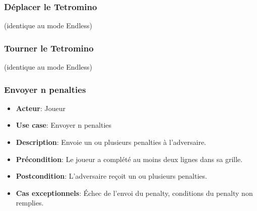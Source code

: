 \documentclass{article}
\begin{document}
\subsubsection*{Déplacer le Tetromino} (identique au mode Endless)

\subsubsection*{Tourner le Tetromino} (identique au mode Endless)

\subsubsection*{Envoyer n penalties}
\begin{itemize}
    \item \textbf{Acteur}: Joueur
    \item \textbf{Use case}: Envoyer n penalties
    \item \textbf{Description}: Envoie un ou plusieurs penalties à l'adversaire.
    \item \textbf{Précondition}: Le joueur a complété au moins deux lignes dans sa grille.
    \item \textbf{Postcondition}: L'adversaire reçoit un ou plusieurs penalties.
    \item \textbf{Cas exceptionnels}: Échec de l’envoi du penalty, conditions du penalty non remplies.
\end{itemize}

\end{document}
